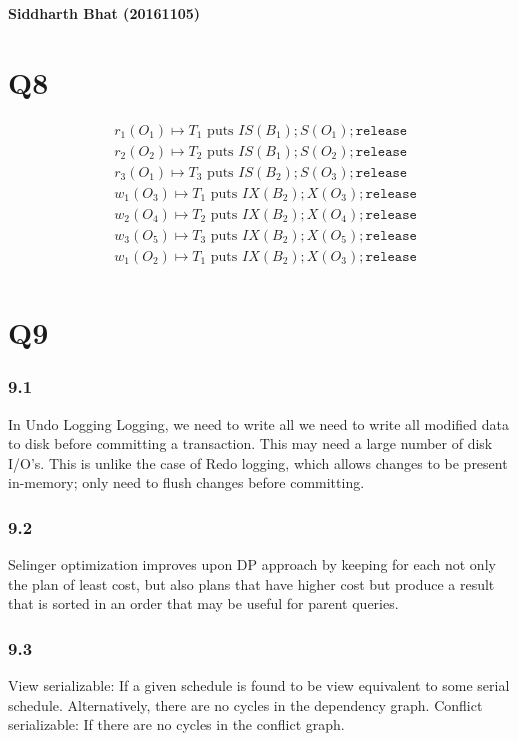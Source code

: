 \documentclass{article}
\begin{document}
\textbf{Siddharth Bhat (20161105)}
\section{Q8}
\begin{align*}
    &r_1(O_1) \mapsto \text{$T_1$ puts }IS(B_1); S(O_1); \texttt{release} \\
    &r_2(O_2) \mapsto \text{$T_2$ puts }IS(B_1); S(O_2); \texttt{release}\\
    &r_3(O_1) \mapsto \text{$T_3$ puts }IS(B_2); S(O_3); \texttt{release}\\
    &w_1(O_3) \mapsto \text{$T_1$ puts }IX(B_2); X(O_3); \texttt{release}\\
    &w_2(O_4) \mapsto \text{$T_2$ puts }IX(B_2); X(O_4); \texttt{release}\\
    &w_3(O_5) \mapsto \text{$T_3$ puts }IX(B_2); X(O_5); \texttt{release}\\
    &w_1(O_2) \mapsto \text{$T_1$ puts }IX(B_2); X(O_3); \texttt{release}\\
\end{align*}
\section{Q9}
\subsubsection{9.1}
In Undo Logging Logging, we need to write all we need to write all modified
data to disk before committing a transaction.  This may need a large number of disk
I/O’s. This is unlike the case of Redo logging, which allows changes to be
present in-memory; only need to flush changes before committing.

\subsubsection{9.2}
Selinger optimization improves upon DP approach by keeping for
each  not only the plan of least cost, but also plans that have higher
cost but produce a result that is sorted in an order that may
be useful for parent queries.
\subsubsection{9.3}

View serializable: If a given schedule is found to be view equivalent to some serial schedule. Alternatively,
  there are no cycles in the dependency graph.
Conflict serializable: If there are no cycles in the conflict graph.
\end{document}
